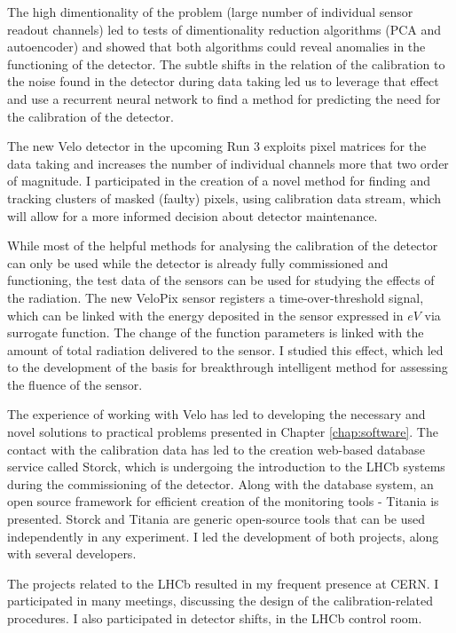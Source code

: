The high dimentionality of the problem (large number of individual sensor readout channels) led to tests of dimentionality reduction algorithms (PCA and autoencoder) and showed that both algorithms could reveal anomalies in the functioning of the detector.
The subtle shifts in the relation of the calibration to the noise found in the detector during data taking led us to leverage that effect and use a recurrent neural network to find a method for predicting the need for the calibration of the detector.

The new Velo detector in the upcoming Run 3 exploits pixel matrices for the data taking and increases the number of individual channels more that two order of magnitude.
I participated in the creation of a novel method for finding and tracking clusters of masked (faulty) pixels, using calibration data stream, which will allow for a more informed decision about detector maintenance.

While most of the helpful methods for analysing the calibration of the detector can only be used while the detector is already fully commissioned and functioning, the test data of the sensors can be used for studying the effects of the radiation.
The new VeloPix sensor registers a time-over-threshold signal, which can be linked with the energy deposited in the sensor expressed in $eV$ via surrogate function. 
The change of the function parameters is linked with the amount of total radiation delivered to the sensor. I studied this effect, which led to the development of the basis for breakthrough intelligent method for assessing the fluence of the sensor.

The experience of working with Velo has led to developing the necessary and novel solutions to practical problems presented in Chapter \ref{chap:software}.
The contact with the calibration data has led to the creation web-based database service called Storck, which is undergoing the introduction to the LHCb systems during the commissioning of the detector.
Along with the database system, an open source framework for efficient creation of the monitoring tools - Titania is presented.
Storck and Titania are generic open-source tools that can be used independently in any experiment.
I led the development of both  projects, along with several developers.

The projects related to the LHCb resulted in my frequent presence at CERN. 
I participated in many meetings, discussing the design of the calibration-related procedures.
I also participated in detector shifts, in the LHCb control room.

